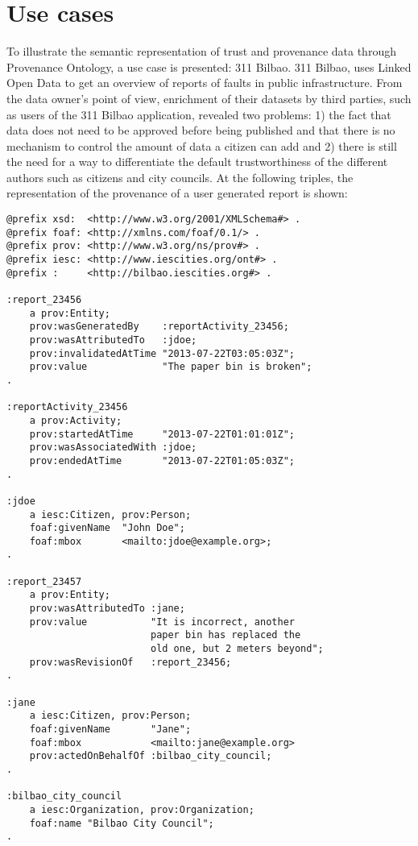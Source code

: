 \section{Use cases}
\label{sec:use_cases}

To illustrate the semantic representation of trust and provenance data through Provenance Ontology, a use case is presented: 311 Bilbao. 311 Bilbao, uses Linked Open Data to get an overview of reports of faults in public infrastructure. From the data owner’s point of view, enrichment of their datasets by third parties, such as users of the 311 Bilbao application, revealed two problems: 1) the fact that data does not need to be approved before being published and that there is no mechanism to control the amount of data a citizen can add and 2) there is still the need for a way to differentiate the default trustworthiness of the different authors such as citizens and city councils. At the following triples, the representation of the provenance of a user generated report is shown:

\lstset{numbers=left, basicstyle=\ttfamily\scriptsize,}
\begin{lstlisting}
@prefix xsd:  <http://www.w3.org/2001/XMLSchema#> .
@prefix foaf: <http://xmlns.com/foaf/0.1/> .
@prefix prov: <http://www.w3.org/ns/prov#> .
@prefix iesc: <http://www.iescities.org/ont#> .
@prefix :     <http://bilbao.iescities.org#> .

:report_23456
    a prov:Entity;
    prov:wasGeneratedBy    :reportActivity_23456;
    prov:wasAttributedTo   :jdoe;
    prov:invalidatedAtTime "2013-07-22T03:05:03Z";
    prov:value             "The paper bin is broken";
.

:reportActivity_23456
    a prov:Activity;
    prov:startedAtTime     "2013-07-22T01:01:01Z";
    prov:wasAssociatedWith :jdoe;
    prov:endedAtTime       "2013-07-22T01:05:03Z";
.

:jdoe
    a iesc:Citizen, prov:Person;
    foaf:givenName  "John Doe";
    foaf:mbox       <mailto:jdoe@example.org>;
.

:report_23457
    a prov:Entity;
    prov:wasAttributedTo :jane;
    prov:value           "It is incorrect, another 
                         paper bin has replaced the 
                         old one, but 2 meters beyond";
    prov:wasRevisionOf   :report_23456;
.

:jane
    a iesc:Citizen, prov:Person;
    foaf:givenName       "Jane";
    foaf:mbox            <mailto:jane@example.org>
    prov:actedOnBehalfOf :bilbao_city_council;
.

:bilbao_city_council
    a iesc:Organization, prov:Organization;
    foaf:name "Bilbao City Council";
.
\end{lstlisting}

